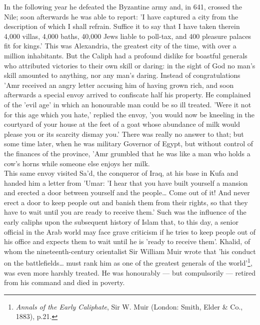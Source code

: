\documentclass[11pt, b5paper, twoside]{book}
\begin{document}
In the following year he defeated the Byzantine army and, in 641, crossed the Nile; soon afterwards he was able to report: 'I have captured a city from the description of which I shall refrain. Suffice it to say that I have taken therein 4,000 villas, 4,000 baths, 40,000 Jews liable to poll-tax, and 400 pleasure palaces fit for kings.' This was Alexandria, the greatest city of the time, with over a million inhabitants. But the Caliph had a profound dislike for boastful generals who attributed victories to their own skill or daring: in the sight of God no man's skill amounted to anything, nor any man's daring. Instead of congratulations 'Amr received an angry letter accusing him of having grown rich, and soon afterwards a special envoy arrived to confiscate half his property. He complained of the 'evil age' in which an honourable man could be so ill treated. 'Were it not for this age which you hate,' replied the envoy, 'you would now be kneeling in the courtyard of your house at the feet of a goat whose abundance of milk would please you or its scarcity dismay you.' There was really no answer to that; but some time later, when he was military Governor of Egypt, but without control of the finances of the province, 'Amr grumbled that he was like a man who holds a cow's horns while someone else enjoys her milk. \\

This same envoy visited Sa'd, the conqueror of Iraq, at his base in Kufa and handed him a letter from 'Umar: 'I hear that you have built yourself a mansion and erected a door between yourself and the people\ldots{} Come out of it! And never erect a door to keep people out and banish them from their rights, so that they have to wait until you are ready to receive them.' Such was the influence of the early caliphs upon the subsequent history of Islam that, to this day, a senior official in the Arab world may face grave criticism if he tries to keep people out of his office and expects them to wait until he is 'ready to receive them'. Khalid, of whom the nineteenth-century orientalist Sir William Muir wrote that 'his conduct on the battlefields\ldots{} must rank him as one of the greatest generals of the world'\footnote{\emph{Annals of the Early Caliphate}, Sir W. Muir (London: Smith, Elder \& Co., 1883), p.21.}, was even more harshly treated. He was honourably --- but compulsorily --- retired from his command and died in poverty. \\
\end{document}
